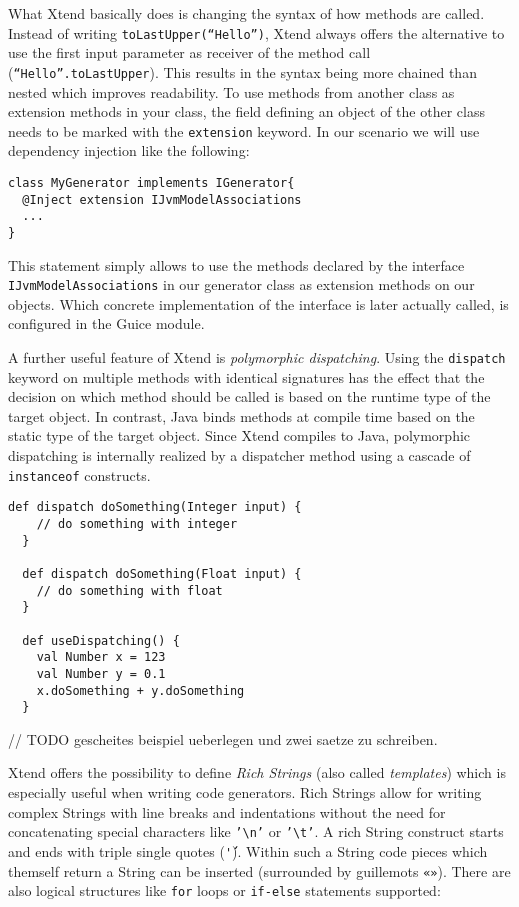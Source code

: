 What Xtend basically does is changing the syntax of how methods are called. Instead
of writing \texttt{toLastUpper(``Hello'')}, Xtend always offers the alternative to
use the first input parameter as receiver of the method call (\texttt{``Hello''.toLastUpper}).
This results in the syntax being more chained than nested which improves readability.
To use methods from another class as extension methods in your class, the field
defining an object of the other class needs to be marked with the \texttt{extension}
keyword. In our scenario we will use dependency injection like the following:

\begin{lstlisting}[language=Xtend]
class MyGenerator implements IGenerator{
  @Inject extension IJvmModelAssociations
  ...
}
\end{lstlisting}

This statement simply allows to use the methods declared by the interface
\newline\texttt{IJvmModelAssociations} in our generator class as extension methods
on our objects. Which concrete implementation of the interface is later actually called, is configured in the Guice module.

A further useful feature of Xtend is \emph{polymorphic dispatching}. Using the \texttt{dispatch}
keyword on multiple methods with identical signatures has the effect that the 
decision on which method should be called is based on the runtime type of the
target object. In contrast, Java binds methods at compile time based on the static
type of the target object. Since Xtend compiles to Java, polymorphic dispatching
is internally realized by a dispatcher method using a cascade of
\texttt{instanceof} constructs. 

\begin{lstlisting}[language=Xtend]
  def dispatch doSomething(Integer input) {
  	// do something with integer
  }
  
  def dispatch doSomething(Float input) {
  	// do something with float
  }
  
  def useDispatching() {
    val Number x = 123
    val Number y = 0.1
    x.doSomething + y.doSomething
  }
\end{lstlisting}

// TODO gescheites beispiel ueberlegen und zwei saetze zu schreiben.

Xtend offers the possibility to define \emph{Rich Strings} (also called \emph{templates})
which is especially useful when writing code generators. Rich Strings allow for
writing complex Strings with line breaks and indentations without the need for
concatenating special characters like \texttt{'\textbackslash n'} or \texttt{'\textbackslash t'}. A rich String
construct starts and ends with triple single quotes (\texttt{\'\'\'}). Within
such a String code pieces which themself return a String can be inserted (surrounded by guillemots \texttt{«»}).
There are also logical structures like \texttt{for} loops or \texttt{if-else}
statements supported:


